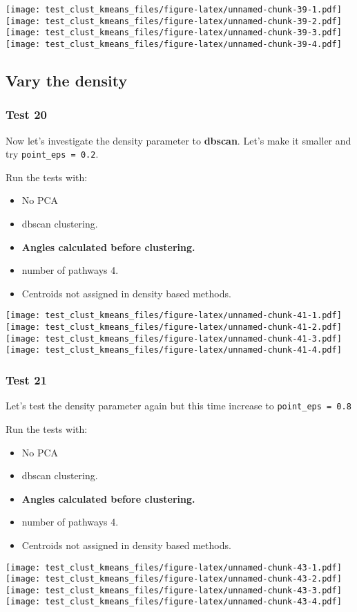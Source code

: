 \documentclass[
]{article}
\providecommand{\tightlist}{%
  \setlength{\itemsep}{0pt}\setlength{\parskip}{0pt}}
\begin{document}
\texttt{[image: test\_clust\_kmeans\_files/figure-latex/unnamed-chunk-39-1.pdf]}
\texttt{[image: test\_clust\_kmeans\_files/figure-latex/unnamed-chunk-39-2.pdf]}
\texttt{[image: test\_clust\_kmeans\_files/figure-latex/unnamed-chunk-39-3.pdf]}
\texttt{[image: test\_clust\_kmeans\_files/figure-latex/unnamed-chunk-39-4.pdf]}

\hypertarget{vary-the-density}{%
\subsection{Vary the density}\label{vary-the-density}}

\hypertarget{test20}{%
\subsubsection{Test 20}\label{test20}}

Now let's investigate the density parameter to \textbf{dbscan}. Let's
make it smaller and try \texttt{point\_eps\ =\ 0.2}.

Run the tests with:

\begin{itemize}
\tightlist
\item
  No PCA
\item
  dbscan clustering.
\item
  \textbf{Angles calculated before clustering.}
\item
  number of pathways 4.
\item
  Centroids not assigned in density based methods.
\end{itemize}

\texttt{[image: test\_clust\_kmeans\_files/figure-latex/unnamed-chunk-41-1.pdf]}
\texttt{[image: test\_clust\_kmeans\_files/figure-latex/unnamed-chunk-41-2.pdf]}
\texttt{[image: test\_clust\_kmeans\_files/figure-latex/unnamed-chunk-41-3.pdf]}
\texttt{[image: test\_clust\_kmeans\_files/figure-latex/unnamed-chunk-41-4.pdf]}

\hypertarget{test21}{%
\subsubsection{Test 21}\label{test21}}

Let's test the density parameter again but this time increase to
\texttt{point\_eps\ =\ 0.8}

Run the tests with:

\begin{itemize}
\tightlist
\item
  No PCA
\item
  dbscan clustering.
\item
  \textbf{Angles calculated before clustering.}
\item
  number of pathways 4.
\item
  Centroids not assigned in density based methods.
\end{itemize}

\texttt{[image: test\_clust\_kmeans\_files/figure-latex/unnamed-chunk-43-1.pdf]}
\texttt{[image: test\_clust\_kmeans\_files/figure-latex/unnamed-chunk-43-2.pdf]}
\texttt{[image: test\_clust\_kmeans\_files/figure-latex/unnamed-chunk-43-3.pdf]}
\texttt{[image: test\_clust\_kmeans\_files/figure-latex/unnamed-chunk-43-4.pdf]}
\end{document}
